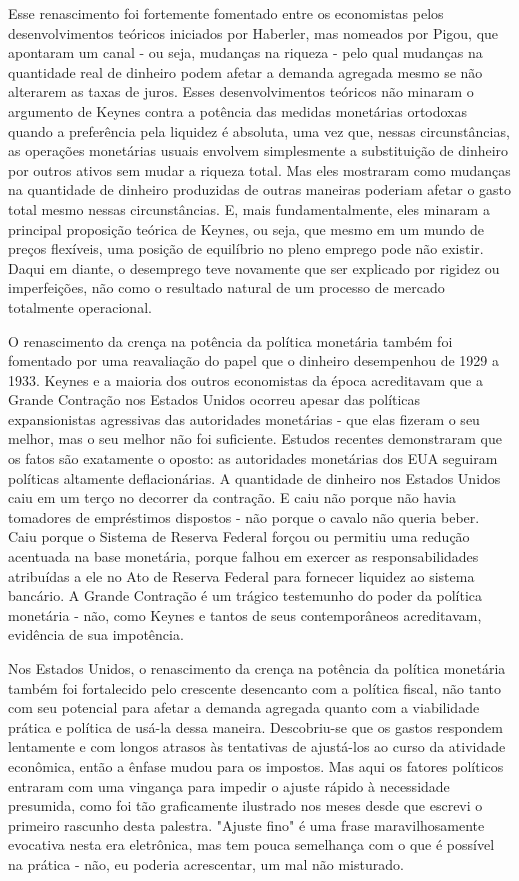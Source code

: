 \documentclass[12pt]{article}
\begin{document}
Esse renascimento foi fortemente fomentado entre os economistas pelos desenvolvimentos teóricos iniciados por Haberler, mas nomeados por Pigou, que apontaram um canal - ou seja, mudanças na riqueza - pelo qual mudanças na quantidade real de dinheiro podem afetar a demanda agregada mesmo se não alterarem as taxas de juros. Esses desenvolvimentos teóricos não minaram o argumento de Keynes contra a potência das medidas monetárias ortodoxas quando a preferência pela liquidez é absoluta, uma vez que, nessas circunstâncias, as operações monetárias usuais envolvem simplesmente a substituição de dinheiro por outros ativos sem mudar a riqueza total. Mas eles mostraram como mudanças na quantidade de dinheiro produzidas de outras maneiras poderiam afetar o gasto total mesmo nessas circunstâncias. E, mais fundamentalmente, eles minaram a principal proposição teórica de Keynes, ou seja, que mesmo em um mundo de preços flexíveis, uma posição de equilíbrio no pleno emprego pode não existir. Daqui em diante, o desemprego teve novamente que ser explicado por rigidez ou imperfeições, não como o resultado natural de um processo de mercado totalmente operacional.

O renascimento da crença na potência da política monetária também foi fomentado por uma reavaliação do papel que o dinheiro desempenhou de 1929 a 1933. Keynes e a maioria dos outros economistas da época acreditavam que a Grande Contração nos Estados Unidos ocorreu apesar das políticas expansionistas agressivas das autoridades monetárias - que elas fizeram o seu melhor, mas o seu melhor não foi suficiente. Estudos recentes demonstraram que os fatos são exatamente o oposto: as autoridades monetárias dos EUA seguiram políticas altamente deflacionárias. A quantidade de dinheiro nos Estados Unidos caiu em um terço no decorrer da contração. E caiu não porque não havia tomadores de empréstimos dispostos - não porque o cavalo não queria beber. Caiu porque o Sistema de Reserva Federal forçou ou permitiu uma redução acentuada na base monetária, porque falhou em exercer as responsabilidades atribuídas a ele no Ato de Reserva Federal para fornecer liquidez ao sistema bancário. A Grande Contração é um trágico testemunho do poder da política monetária - não, como Keynes e tantos de seus contemporâneos acreditavam, evidência de sua impotência.

Nos Estados Unidos, o renascimento da crença na potência da política monetária também foi fortalecido pelo crescente desencanto com a política fiscal, não tanto com seu potencial para afetar a demanda agregada quanto com a viabilidade prática e política de usá-la dessa maneira. Descobriu-se que os gastos respondem lentamente e com longos atrasos às tentativas de ajustá-los ao curso da atividade econômica, então a ênfase mudou para os impostos. Mas aqui os fatores políticos entraram com uma vingança para impedir o ajuste rápido à necessidade presumida, como foi tão graficamente ilustrado nos meses desde que escrevi o primeiro rascunho desta palestra. "Ajuste fino" é uma frase maravilhosamente evocativa nesta era eletrônica, mas tem pouca semelhança com o que é possível na prática - não, eu poderia acrescentar, um mal não misturado.
\end{document}
